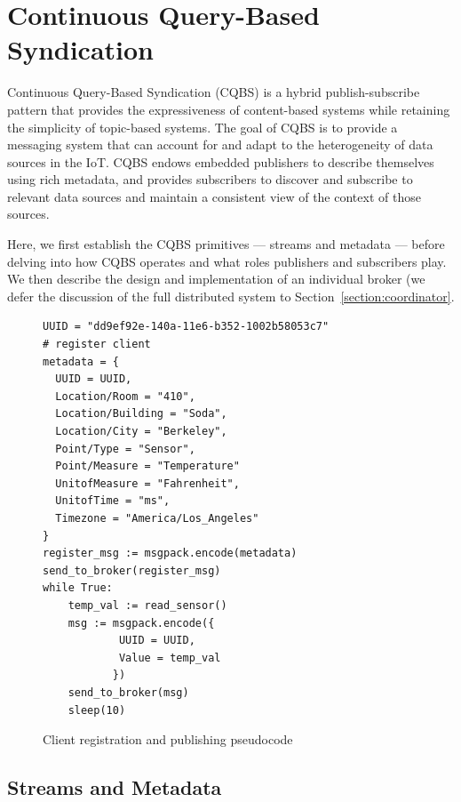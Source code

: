 \section{Continuous Query-Based Syndication}

Continuous Query-Based Syndication (CQBS) is a hybrid publish-subscribe pattern that provides the expressiveness of content-based systems while retaining the simplicity of topic-based systems.
The goal of CQBS is to provide a messaging system that can account for and adapt to the heterogeneity of data sources in the IoT.
CQBS endows embedded publishers to describe themselves using rich metadata, and provides subscribers to discover and subscribe to relevant data sources and maintain a consistent view of the context of those sources.

Here, we first establish the CQBS primitives --- streams and metadata --- before delving into how CQBS operates and what roles publishers and subscribers play.
We then describe the design and implementation of an individual broker (we defer the discussion of the full distributed system to Section~\ref{section:coordinator}.

\begin{figure}
\centering
\begin{lstlisting}[language=pseudocode,basicstyle=\small]
UUID = "dd9ef92e-140a-11e6-b352-1002b58053c7"
# register client
metadata = {
  UUID = UUID,
  Location/Room = "410",
  Location/Building = "Soda",
  Location/City = "Berkeley",
  Point/Type = "Sensor",
  Point/Measure = "Temperature"
  UnitofMeasure = "Fahrenheit",
  UnitofTime = "ms",
  Timezone = "America/Los_Angeles"
}
register_msg := msgpack.encode(metadata)
send_to_broker(register_msg)
while True:
    temp_val := read_sensor()
    msg := msgpack.encode({
            UUID = UUID,
            Value = temp_val
           })
    send_to_broker(msg)
    sleep(10)
\end{lstlisting}
\caption{Client registration and publishing pseudocode}
\label{fig:pseudoclient}
\end{figure}

\subsection{Streams and Metadata}

